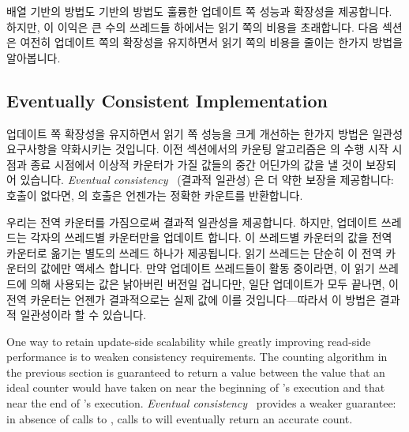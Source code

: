 배열 기반의 방법도  기반의 방법도 훌륭한 업데이트 쪽 성능과
확장성을 제공합니다.
하지만, 이 이익은 큰 수의 쓰레드들 하에서는 읽기 쪽의 비용을 초래합니다.
다음 섹션은 여전히 업데이트 쪽의 확장성을 유지하면서 읽기 쪽의 비용을 줄이는
한가지 방법을 알아봅니다.

\subsection{Eventually Consistent Implementation}
\label{sec:count:Eventually Consistent Implementation}

업데이트 쪽 확장성을 유지하면서 읽기 쪽 성능을 크게 개선하는 한가지 방법은
일관성 요구사항을 약화시키는 것입니다.
이전 섹션에서의 카운팅 알고리즘은  의 수행 시작 시점과 종료
시점에서 이상적 카운터가 가질 값들의 중간 어딘가의 값을 낼 것이 보장되어
있습니다.
\emph{Eventual consistency}~\cite{WernerVogels:2009:EventuallyConsistent}
(결과적 일관성) 은 더 약한 보장을 제공합니다:  호출이 없다면,
 의 호출은 언젠가는 정확한 카운트를 반환합니다.

우리는 전역 카운터를 가짐으로써 결과적 일관성을 제공합니다.
하지만, 업데이트 쓰레드는 각자의 쓰레드별 카운터만을 업데이트 합니다.
이 쓰레드별 카운터의 값을 전역 카운터로 옮기는 별도의 쓰레드 하나가 제공됩니다.
읽기 쓰레드는 단순히 이 전역 카운터의 값에만 액세스 합니다.
만약 업데이트 쓰레드들이 활동 중이라면, 이 읽기 쓰레드에 의해 사용되는 값은
낡아버린 버전일 겁니다만, 일단 업데이트가 모두 끝나면, 이 전역 카운터는 언젠가
결과적으로는 실제 값에 이를 것입니다---따라서 이 방법은 결과적 일관성이라 할 수
있습니다.

\iffalse

One way to retain update-side scalability while greatly improving
read-side performance is to weaken consistency requirements.
The counting algorithm in the previous section is guaranteed to
return a value between the value that an ideal counter would have
taken on near the beginning of 's execution and
that near the end of 's execution.
\emph{Eventual consistency}~\cite{WernerVogels:2009:EventuallyConsistent}
provides a weaker
guarantee: in absence of calls to , calls to
 will eventually return an accurate count.

